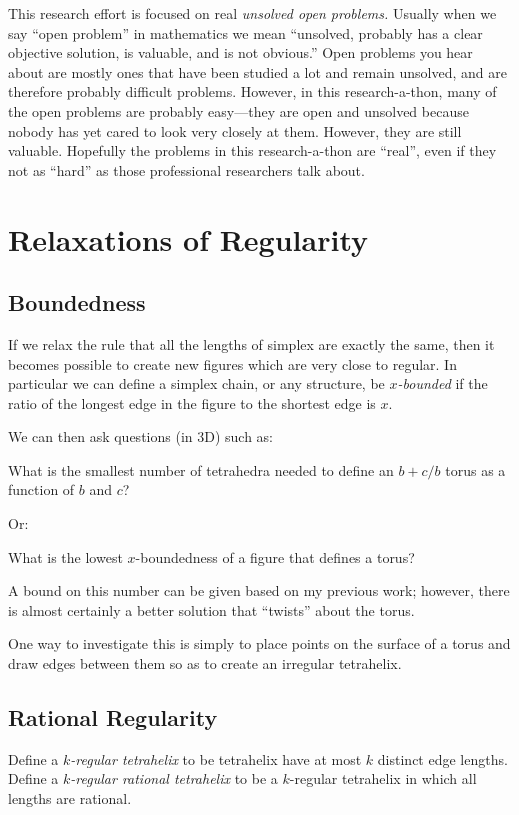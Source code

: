 \documentclass[11pt]{article}
\begin{document}
This research effort is focused on real {\em unsolved open problems.}
Usually when we say ``open problem'' in mathematics we mean ``unsolved, probably has a clear objective solution, is valuable,
and is not obvious.''
Open problems you hear about are mostly ones that have been studied a lot and remain unsolved, and are therefore probably difficult problems.
However, in this research-a-thon, many of the open problems are probably easy---they are open and unsolved because nobody has yet
cared to look very closely at them.  However, they are still valuable. Hopefully the problems in this research-a-thon are ``real'', even if they
not as ``hard'' as those professional researchers talk about. 


\section{Relaxations of Regularity}
\subsection{Boundedness}

If we relax the rule that all the lengths of simplex are exactly the same, then it becomes possible to create new figures which are
very close to regular. In particular we can define a simplex chain, or any structure, be {\em $x$-bounded} if the ratio of the longest edge
in the figure to the shortest edge is $x$.

We can then ask questions (in 3D) such as:

What is the smallest number of tetrahedra needed to define an $b+c/b$ torus as a function of $b$ and $c$?

Or:

What is the lowest $x$-boundedness of a figure that defines a torus?

A bound on this number can be given based on my previous work; however, there is almost certainly a better solution that ``twists'' about the torus.

One way to investigate this is simply to place points on the surface of a torus and draw edges between them so as to create an irregular tetrahelix.

\subsection{Rational Regularity}

Define a {\em $k$-regular tetrahelix} to be tetrahelix have at most $k$ distinct edge lengths.
Define a {\em $k$-regular rational tetrahelix} to be a $k$-regular tetrahelix in which all lengths are rational.
\end{document}
